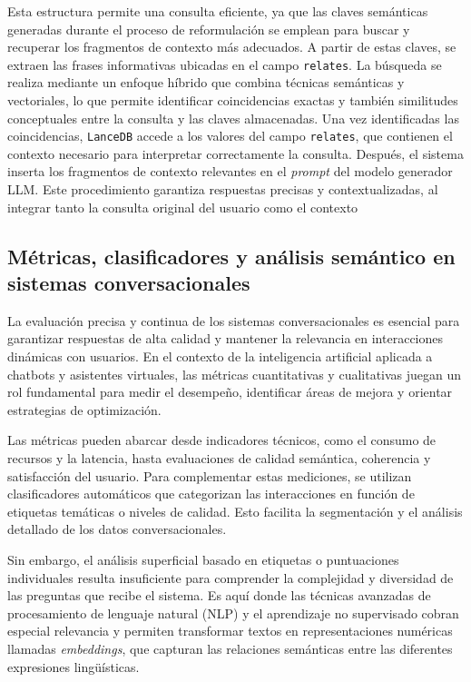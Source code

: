     Esta estructura permite una consulta eficiente, ya que las claves semánticas generadas durante el proceso de reformulación se emplean para buscar y recuperar los fragmentos de contexto más adecuados. A partir de estas claves, se extraen las frases informativas ubicadas en el campo \texttt{relates}. La búsqueda se realiza mediante un enfoque híbrido que combina técnicas semánticas y vectoriales, lo que permite identificar coincidencias exactas y también similitudes conceptuales entre la consulta y las claves almacenadas.
    Una vez identificadas las coincidencias, \texttt{LanceDB} accede a los valores del campo \texttt{relates}, que contienen el contexto necesario para interpretar correctamente la consulta. Después, el sistema inserta los fragmentos de contexto relevantes en el \textit{prompt} del modelo generador LLM. Este procedimiento garantiza respuestas precisas y contextualizadas, al integrar tanto la consulta original del usuario como el contexto


\subsection{Métricas, clasificadores y análisis semántico en sistemas conversacionales}

    La evaluación precisa y continua de los sistemas conversacionales es esencial para garantizar respuestas de alta calidad y mantener la relevancia en interacciones dinámicas con usuarios. En el contexto de la inteligencia artificial aplicada a chatbots y asistentes virtuales, las métricas cuantitativas y cualitativas juegan un rol fundamental para medir el desempeño, identificar áreas de mejora y orientar estrategias de optimización.

    Las métricas pueden abarcar desde indicadores técnicos, como el consumo de recursos y la latencia, hasta evaluaciones de calidad semántica, coherencia y satisfacción del usuario. Para complementar estas mediciones, se utilizan clasificadores automáticos que categorizan las interacciones en función de etiquetas temáticas o niveles de calidad. Esto facilita la segmentación y el análisis detallado de los datos conversacionales.

    Sin embargo, el análisis superficial basado en etiquetas o puntuaciones individuales resulta insuficiente para comprender la complejidad y diversidad de las preguntas que recibe el sistema. Es aquí donde las técnicas avanzadas de procesamiento de lenguaje natural (NLP) y el aprendizaje no supervisado cobran especial relevancia y permiten transformar textos en representaciones numéricas llamadas \textit{embeddings}, que capturan las relaciones semánticas entre las diferentes expresiones lingüísticas.

